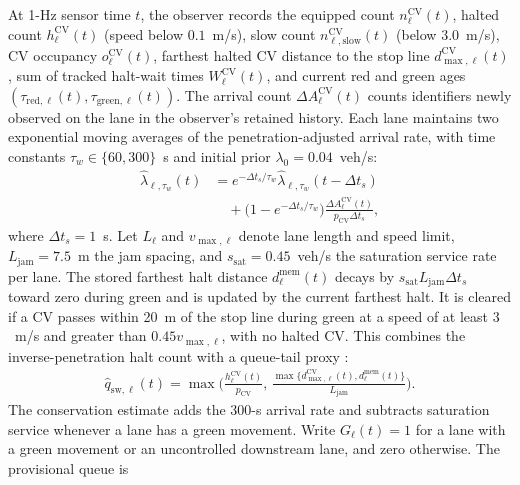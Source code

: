 \documentclass[letterpaper,journal]{IEEEtran}
\begin{document}
At 1-Hz sensor time $t$, the observer records the equipped count $n_\ell^{\mathrm{CV}}(t)$, halted count $h_\ell^{\mathrm{CV}}(t)$ (speed below $0.1$~m/s), slow count $n_{\ell,\mathrm{slow}}^{\mathrm{CV}}(t)$ (below $3.0$~m/s), CV occupancy $o_\ell^{\mathrm{CV}}(t)$, farthest halted CV distance to the stop line $d_{\max,\ell}^{\mathrm{CV}}(t)$, sum of tracked halt-wait times $W_\ell^{\mathrm{CV}}(t)$, and current red and green ages $(\tau_{\mathrm{red},\ell}(t),\tau_{\mathrm{green},\ell}(t))$. The arrival count $\Delta A_\ell^{\mathrm{CV}}(t)$ counts identifiers newly observed on the lane in the observer's retained history. Each lane maintains two exponential moving averages of the penetration-adjusted arrival rate, with time constants $\tau_w\in\{60,300\}$~s and initial prior $\lambda_0=0.04$~veh/s:
\begin{equation}
\begin{split}
  \hat{\lambda}_{\ell,\tau_w}(t) &= e^{-\Delta t_s/\tau_w}\hat{\lambda}_{\ell,\tau_w}(t-\Delta t_s)\\
  &\quad + \bigl(1-e^{-\Delta t_s/\tau_w}\bigr)\frac{\Delta A_\ell^{\mathrm{CV}}(t)}{p_{\mathrm{CV}}\Delta t_s},
\end{split}
  \label{eq:ema_arrival}
\end{equation}
where $\Delta t_s=1$~s. Let $L_\ell$ and $v_{\max,\ell}$ denote lane length and speed limit, $L_{\mathrm{jam}}=7.5$~m the jam spacing, and $s_{\mathrm{sat}}=0.45$~veh/s the saturation service rate per lane. The stored farthest halt distance $d_{\ell}^{\mathrm{mem}}(t)$ decays by $s_{\mathrm{sat}}L_{\mathrm{jam}}\Delta t_s$ toward zero during green and is updated by the current farthest halt. It is cleared if a CV passes within 20~m of the stop line during green at a speed of at least $3$~m/s and greater than $0.45v_{\max,\ell}$, with no halted CV. This combines the inverse-penetration halt count with a queue-tail proxy \cite{liu2009realtime}:
\begin{equation}
\begin{split}
  \hat q_{\mathrm{sw},\ell}(t) = \max\!\Bigg(
    \frac{h_\ell^{\mathrm{CV}}(t)}{p_{\mathrm{CV}}},\,
    \frac{\max\{d_{\max,\ell}^{\mathrm{CV}}(t),d_\ell^{\mathrm{mem}}(t)\}}
    {L_{\mathrm{jam}}}
  \Bigg).
\end{split}
  \label{eq:q_sw}
\end{equation}
The conservation estimate adds the 300-s arrival rate and subtracts saturation service whenever a lane has a green movement. Write $G_\ell(t)=1$ for a lane with a green movement or an uncontrolled downstream lane, and zero otherwise. The provisional queue is
\end{document}
